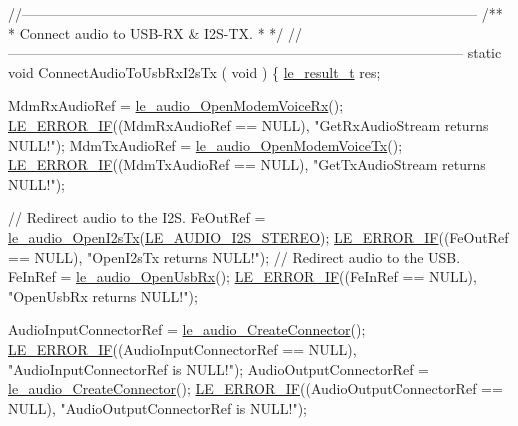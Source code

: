 \begin{DoxyCodeInclude}
{{{{{{{{{{{\textcolor{comment}{//--------------------------------------------------------------------------------------------------}\textcolor{comment}{}
\textcolor{comment}{/**}
\textcolor{comment}{ * Connect audio to USB-RX & I2S-TX.}
\textcolor{comment}{ *}
\textcolor{comment}{ */}
\textcolor{comment}{//--------------------------------------------------------------------------------------------------}
\textcolor{keyword}{static} \textcolor{keywordtype}{void} ConnectAudioToUsbRxI2sTx
(
    \textcolor{keywordtype}{void}
)
\{
    \hyperlink{le__basics_8h_a1cca095ed6ebab24b57a636382a6c86c}{le\_result\_t} res;

    MdmRxAudioRef = \hyperlink{le__audio__interface_8h_ae3ed568ba4d2763ea77e17e77b20ff02}{le\_audio\_OpenModemVoiceRx}();
    \hyperlink{le__log_8h_aceaf11a11691d6c676e36dd317b38dbd}{LE\_ERROR\_IF}((MdmRxAudioRef == NULL), \textcolor{stringliteral}{"GetRxAudioStream returns NULL!"});
    MdmTxAudioRef = \hyperlink{le__audio__interface_8h_ad745f008bb04873c817da7af3daf783d}{le\_audio\_OpenModemVoiceTx}();
    \hyperlink{le__log_8h_aceaf11a11691d6c676e36dd317b38dbd}{LE\_ERROR\_IF}((MdmTxAudioRef == NULL), \textcolor{stringliteral}{"GetTxAudioStream returns NULL!"});

    \textcolor{comment}{// Redirect audio to the I2S.}
    FeOutRef = \hyperlink{le__audio__interface_8h_a2633c1368adf60e342d7cadbbfa6278b}{le\_audio\_OpenI2sTx}(\hyperlink{le__audio__interface_8h_a94794180ed71a84bd26a1f525858f252a6ce77f5f956b203e15f662900a5103dd}{LE\_AUDIO\_I2S\_STEREO});
    \hyperlink{le__log_8h_aceaf11a11691d6c676e36dd317b38dbd}{LE\_ERROR\_IF}((FeOutRef == NULL), \textcolor{stringliteral}{"OpenI2sTx returns NULL!"});
    \textcolor{comment}{// Redirect audio to the USB.}
    FeInRef = \hyperlink{le__audio__interface_8h_acd8be89289067cef9441a8ed1d891146}{le\_audio\_OpenUsbRx}();
    \hyperlink{le__log_8h_aceaf11a11691d6c676e36dd317b38dbd}{LE\_ERROR\_IF}((FeInRef == NULL), \textcolor{stringliteral}{"OpenUsbRx returns NULL!"});

    AudioInputConnectorRef = \hyperlink{le__audio__interface_8h_a570aaf85086f00aca592acfbaaa237be}{le\_audio\_CreateConnector}();
    \hyperlink{le__log_8h_aceaf11a11691d6c676e36dd317b38dbd}{LE\_ERROR\_IF}((AudioInputConnectorRef == NULL), \textcolor{stringliteral}{"AudioInputConnectorRef is NULL!"});
    AudioOutputConnectorRef = \hyperlink{le__audio__interface_8h_a570aaf85086f00aca592acfbaaa237be}{le\_audio\_CreateConnector}();
    \hyperlink{le__log_8h_aceaf11a11691d6c676e36dd317b38dbd}{LE\_ERROR\_IF}((AudioOutputConnectorRef == NULL), \textcolor{stringliteral}{"AudioOutputConnectorRef is NULL!"});

}}}}}}}}}}}
\end{DoxyCodeInclude}
